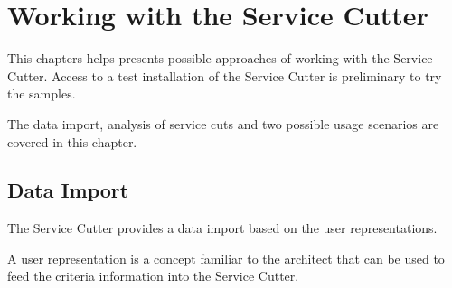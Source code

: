 \chapter{Working with the Service Cutter} 

This chapters helps presents possible approaches of working with the Service Cutter. Access to a test installation of the Service Cutter is preliminary to try the samples.

The data import, analysis of service cuts and two possible usage scenarios are covered in this chapter.









\section{Data Import}

The Service Cutter provides a data import based on the user representations.

A user representation is a concept familiar to the architect that can be used to feed the criteria information into the Service Cutter. 

